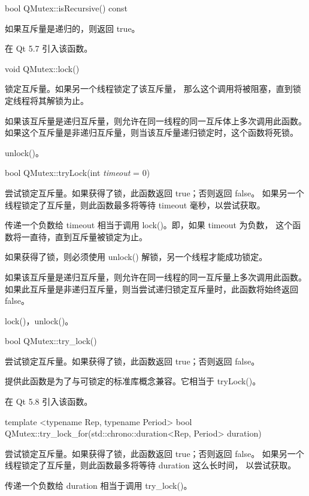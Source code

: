 bool QMutex::isRecursive() const

如果互斥量是递归的，则返回 true。

在 Qt 5.7 引入该函数。

void QMutex::lock()

锁定互斥量。如果另一个线程锁定了该互斥量，
那么这个调用将被阻塞，直到锁定线程将其解锁为止。

如果该互斥量是递归互斥量，则允许在同一线程的同一互斥体上多次调用此函数。
如果这个互斥量是非递归互斥量，则当该互斥量递归锁定时，这个函数将死锁。

\begin{seeAlso}
unlock()。
\end{seeAlso}

bool QMutex::tryLock(int \emph{timeout} = 0)

尝试锁定互斥量。如果获得了锁，此函数返回 true；否则返回 false。
如果另一个线程锁定了互斥量，则此函数最多将等待 timeout 毫秒，以尝试获取。

\begin{notice}
传递一个负数给 timeout 相当于调用 lock()。即，如果 timeout 为负数，
这个函数将一直待，直到互斥量被锁定为止。
\end{notice}

如果获得了锁，则必须使用 unlock() 解锁，另一个线程才能成功锁定。

如果该互斥量是递归互斥量，则允许在同一线程的同一互斥量上多次调用此函数。
如果此互斥量是非递归互斥量，则当尝试递归锁定互斥量时，此函数将始终返回 false。

\begin{seeAlso}
lock()，unlock()。
\end{seeAlso}

bool QMutex::try\_lock()

尝试锁定互斥量。如果获得了锁，此函数返回 true；否则返回 false。

提供此函数是为了与可锁定的标准库概念兼容。它相当于 tryLock()。

在 Qt 5.8 引入该函数。

template <typename Rep, typename Period> bool QMutex::try\_lock\_for(std::chrono::duration<Rep, Period> duration)

尝试锁定互斥量。如果获得了锁，此函数返回 true；否则返回 false。
如果另一个线程锁定了互斥量，则此函数最多将等待 duration 这么长时间，
以尝试获取。

\begin{notice}
传递一个负数给 duration 相当于调用 try\_lock()。
\end{notice}

